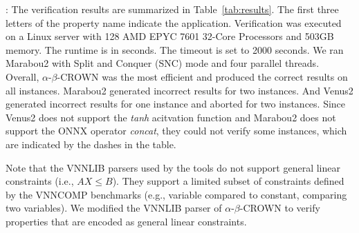 : The verification results are summarized in Table~\ref{tab:results}. The first three letters of the property name indicate the application. Verification was executed on a Linux server with 128 AMD EPYC 7601 32-Core Processors and 503GB memory. The runtime is in seconds. The timeout is set to 2000 seconds. We ran Marabou2 with Split and Conquer (SNC) mode and four parallel threads. Overall, $\alpha$-$\beta$-CROWN was the most efficient and produced the correct results on all instances. Marabou2 generated incorrect results for two instances. And Venus2 generated incorrect results for one instance and aborted for two instances. Since Venus2 does not support the \emph{tanh} acitvation function and Marabou2 does not support the ONNX operator \emph{concat}, they could not verify some instances, which are indicated by the dashes in the table.

Note that the VNNLIB parsers used by the tools do not support general linear constraints (i.e., $AX\le B$). They support a limited subset of constraints defined by the VNNCOMP benchmarks (e.g., variable compared to constant, comparing two variables). We modified the VNNLIB parser of $\alpha$-$\beta$-CROWN to verify properties that are encoded as general linear constraints. 


